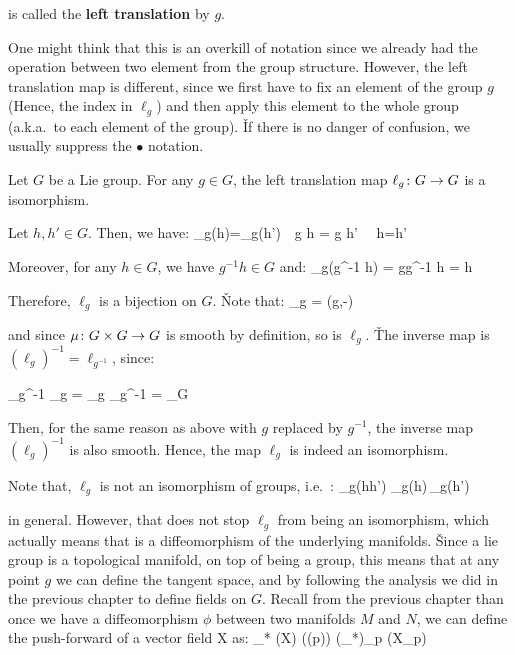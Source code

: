 is called the \textbf{left translation} by $g$.
\ed

One might think that this is an overkill of notation since we already had the operation between two element from the
group structure. However, the left translation map is different, since we first have to fix an element of the group
$g$ (Hence, the index in $\ell_g$) and then apply this element to the whole group (a.k.a.\ to each element of the group). \v

If there is no danger of confusion, we usually suppress the $\bullet$ notation.

\bt[]
Let $G$ be a Lie group. For any $g\in G$, the left translation map $\ell_g\colon G \to G$ is a isomorphism.
\et

\bq
Let $h,h'\in G$. Then, we have:
\bse
\ell_g(h)=\ell_g(h')\ \Leftrightarrow\ g h = g h' \ \Leftrightarrow\ h=h'
\ese

Moreover, for any $h\in G$, we have $g^{-1} h\in G$ and:
\bse
\ell_g(g^{-1} h) = gg^{-1} h = h
\ese

Therefore, $\ell_g$ is a bijection on $G$. \v

Note that:
\bse
\ell_g = \mu(g,-)
\ese

and since $\mu\colon G\times G \to G$ is smooth by definition, so is $\ell_g$. \v

The inverse map is $(\ell_g)^{-1}=\ell_{g^{-1}}$, since:

\bse
\ell_{g^{-1}} \circ \ell_{g} = \ell_{g} \circ \ell_{g^{-1}} = \id_G
\ese

Then, for the same reason as above with $g$ replaced by $g^{-1}$, the inverse map $(\ell_g)^{-1}$ is also smooth.
Hence, the map $\ell_g$ is indeed an isomorphism.
\eq

Note that, $\ell_g$ is not an isomorphism of groups, i.e.\ :
\bse
\ell_g(hh') \neq \ell_g(h)\,\ell_g(h')
\ese

in general. However, that does not stop $\ell_g$ from being an isomorphism, which actually means that is a
diffeomorphism of the underlying manifolds. \v

Since a lie group is a topological manifold, on top of being a group, this means that at any point $g$ we can define
the tangent space, and by following the analysis we did in the previous chapter to define fields on $G$. Recall from
the previous chapter than once we have a diffeomorphism $\phi$ between two manifolds $M$ and $N$, we can define the
push-forward of a vector field X as:
\bse
\phi_* (X) (\phi(p)) \coloneqq (\phi_*)_p (X_p)
\ese

